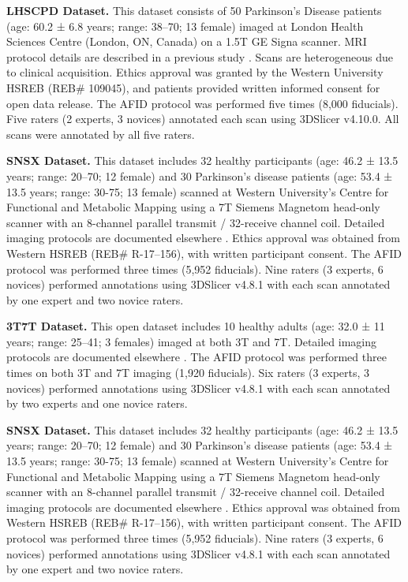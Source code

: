\textbf{LHSCPD Dataset.} This dataset consists of 50 Parkinson’s Disease patients (age: 60.2 ± 6.8 years; range: 38–70; 13 female) imaged at London Health Sciences Centre (London, ON, Canada) on a 1.5T GE Signa scanner. MRI protocol details are described in a previous study \cite{Abbass2022-lf}. Scans are heterogeneous due to clinical acquisition. Ethics approval was granted by the Western University HSREB (REB\# 109045), and patients provided written informed consent for open data release. The AFID protocol was performed five times (8,000 fiducials). Five raters (2 experts, 3 novices) annotated each scan using 3DSlicer v4.10.0. All scans were annotated by all five raters.

\textbf{SNSX Dataset.} This dataset includes 32 healthy participants (age: 46.2 ± 13.5 years; range: 20–70; 12 female) and 30 Parkinson's disease patients (age: 53.4 ± 13.5 years; range: 30-75; 13 female) scanned at Western University's Centre for Functional and Metabolic Mapping using a 7T Siemens Magnetom head-only scanner with an 8-channel parallel transmit / 32-receive channel coil. Detailed imaging protocols are documented elsewhere \cite{Lau2020-dh}. Ethics approval was obtained from Western HSREB (REB\# R-17–156), with written participant consent. The AFID protocol was performed three times (5,952 fiducials). Nine raters (3 experts, 6 novices) performed annotations using 3DSlicer v4.8.1 with each scan annotated by one expert and two novice raters.

\textbf{3T7T Dataset.} This open dataset includes 10 healthy adults (age: 32.0 ± 11 years; range: 25–41; 3 females) imaged at both 3T and 7T. Detailed imaging protocols are documented elsewhere \cite{Chen2023-cn}. The AFID protocol was performed three times on both 3T and 7T imaging (1,920 fiducials). Six raters (3 experts, 3 novices) performed annotations using 3DSlicer v4.8.1 with each scan annotated by two experts and one novice raters.

\textbf{SNSX Dataset.} This dataset includes 32 healthy participants (age: 46.2 ± 13.5 years; range: 20–70; 12 female) and 30 Parkinson's disease patients (age: 53.4 ± 13.5 years; range: 30-75; 13 female) scanned at Western University's Centre for Functional and Metabolic Mapping using a 7T Siemens Magnetom head-only scanner with an 8-channel parallel transmit / 32-receive channel coil. Detailed imaging protocols are documented elsewhere \cite{Lau2020-dh}. Ethics approval was obtained from Western HSREB (REB\# R-17–156), with written participant consent. The AFID protocol was performed three times (5,952 fiducials). Nine raters (3 experts, 6 novices) performed annotations using 3DSlicer v4.8.1 with each scan annotated by one expert and two novice raters.

